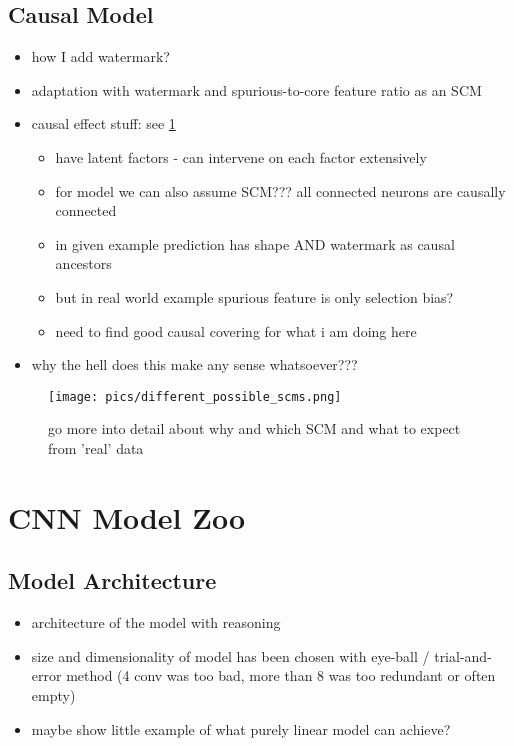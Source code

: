\subsection{Causal Model}


\begin{itemize}
    \item how I add watermark?
    \item adaptation with watermark and spurious-to-core feature ratio as an SCM
    \item causal effect stuff: see \cref{fig:possible_scms}
          \begin{itemize}
              \item have latent factors - can intervene on each factor extensively
              \item for model we can also assume SCM??? all connected neurons are causally connected
              \item in given example prediction has shape AND watermark as causal ancestors
              \item but in real world example spurious feature is only selection bias?
              \item need to find good causal covering for what i am doing here
          \end{itemize}
    \item why the hell does this make any sense whatsoever??? 
\end{itemize}

\begin{figure}
    \centering
    \texttt{[image: pics/different\_possible\_scms.png]}
    \caption{go more into detail about why and which SCM and what to expect from 'real' data}
    \label{fig:possible_scms}
\end{figure}

\section{CNN Model Zoo}
\subsection{Model Architecture}
\begin{itemize}
    \item architecture of the model with reasoning
    \item size and dimensionality of model has been chosen with eye-ball / trial-and-error method (4 conv was too bad, more than 8 was too redundant or often empty)
    \item maybe show little example of what purely linear model can achieve?
\end{itemize}

